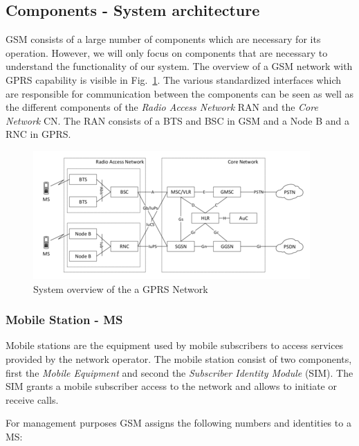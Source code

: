 \documentclass[master,english]{hgbthesis}
\begin{document}
\subsection{Components - System architecture}

GSM consists of a large number of components which are necessary for its operation. However, we will only focus on components that are necessary to understand the functionality of our system. The overview of a GSM network with GPRS capability is visible in Fig.\ \ref{fig:GSMNetwork}.  The various standardized interfaces which are responsible for communication between the components can be seen as well as the different components of the \emph{Radio Access Network} RAN and the \emph{Core Network} CN. The RAN consists of a BTS and BSC in GSM and a Node B and a RNC in GPRS.

\begin{figure}

	\centering

	\includegraphics[width=\linewidth]{./images/GSMNetwork.png}

	\caption{System overview of the a GPRS Network}

	\label{fig:GSMNetwork}

\end{figure}

\subsubsection{Mobile Station - MS}

Mobile stations are the equipment used by mobile subscribers to access services provided by the network operator. The mobile station consist of two components, first the \emph{Mobile Equipment} and second the \emph{Subscriber Identity Module} (SIM). The SIM grants a mobile subscriber access to the network and allows to initiate or receive calls.

For management purposes GSM assigns the following numbers and identities to a MS:
\end{document}
